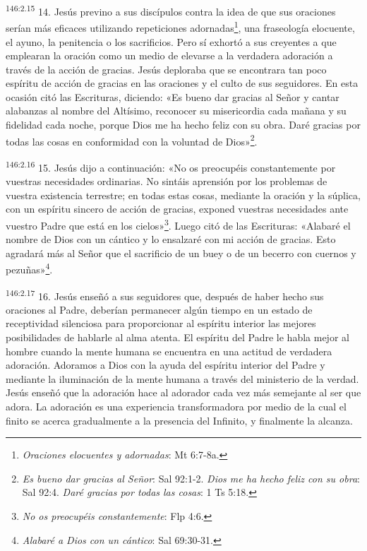 \par 
\textsuperscript{146:2.15} 14. Jesús previno a sus discípulos contra la idea de que sus oraciones serían más eficaces utilizando repeticiones adornadas\footnote{\textit{Oraciones elocuentes y adornadas}: Mt 6:7-8a.}, una fraseología elocuente, el ayuno, la penitencia o los sacrificios. Pero sí exhortó a sus creyentes a que emplearan la oración como un medio de elevarse a la verdadera adoración a través de la acción de gracias. Jesús deploraba que se encontrara tan poco espíritu de acción de gracias en las oraciones y el culto de sus seguidores. En esta ocasión citó las Escrituras, diciendo: «Es bueno dar gracias al Señor y cantar alabanzas al nombre del Altísimo, reconocer su misericordia cada mañana y su fidelidad cada noche, porque Dios me ha hecho feliz con su obra. Daré gracias por todas las cosas en conformidad con la voluntad de Dios»\footnote{\textit{Es bueno dar gracias al Señor}: Sal 92:1-2. \textit{Dios me ha hecho feliz con su obra}: Sal 92:4. \textit{Daré gracias por todas las cosas}: 1 Ts 5:18.}.

\par 
\textsuperscript{146:2.16} 15. Jesús dijo a continuación: «No os preocupéis constantemente por vuestras necesidades ordinarias. No sintáis aprensión por los problemas de vuestra existencia terrestre; en todas estas cosas, mediante la oración y la súplica, con un espíritu sincero de acción de gracias, exponed vuestras necesidades ante vuestro Padre que está en los cielos»\footnote{\textit{No os preocupéis constantemente}: Flp 4:6.}. Luego citó de las Escrituras: «Alabaré el nombre de Dios con un cántico y lo ensalzaré con mi acción de gracias. Esto agradará más al Señor que el sacrificio de un buey o de un becerro con cuernos y pezuñas»\footnote{\textit{Alabaré a Dios con un cántico}: Sal 69:30-31.}.

\par 
\textsuperscript{146:2.17} 16. Jesús enseñó a sus seguidores que, después de haber hecho sus oraciones al Padre, deberían permanecer algún tiempo en un estado de receptividad silenciosa para proporcionar al espíritu interior las mejores posibilidades de hablarle al alma atenta. El espíritu del Padre le habla mejor al hombre cuando la mente humana se encuentra en una actitud de verdadera adoración. Adoramos a Dios con la ayuda del espíritu interior del Padre y mediante la iluminación de la mente humana a través del ministerio de la verdad. Jesús enseñó que la adoración hace al adorador cada vez más semejante al ser que adora. La adoración es una experiencia transformadora por medio de la cual el finito se acerca gradualmente a la presencia del Infinito, y finalmente la alcanza.

